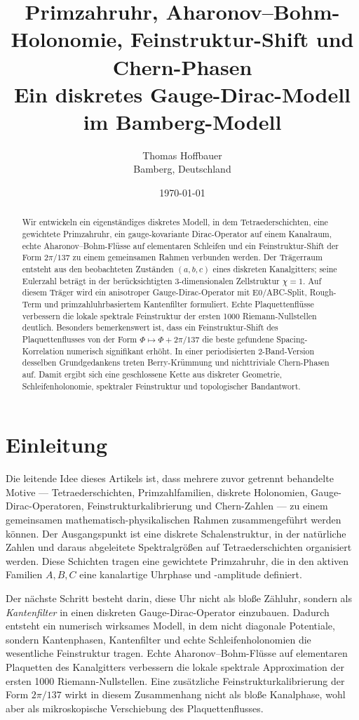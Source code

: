 \documentclass[11pt,a4paper]{article}
\title{Primzahruhr, Aharonov--Bohm-Holonomie, Feinstruktur-Shift und Chern-Phasen\\
	\large Ein diskretes Gauge-Dirac-Modell im Bamberg-Modell}
\author{Thomas Hoffbauer\\Bamberg, Deutschland}
\date{\today}
\theoremstyle{remark}
\begin{document}
	\maketitle
	
	\begin{abstract}
		Wir entwickeln ein eigenständiges diskretes Modell, in dem Tetraederschichten, eine gewichtete Primzahruhr, ein gauge-kovariante Dirac-Operator auf einem Kanalraum, echte Aharonov--Bohm-Flüsse auf elementaren Schleifen und ein Feinstruktur-Shift der Form $2\pi/137$ zu einem gemeinsamen Rahmen verbunden werden. Der Trägerraum entsteht aus den beobachteten Zuständen $(a,b,c)$ eines diskreten Kanalgitters; seine Eulerzahl beträgt in der berücksichtigten 3-dimensionalen Zellstruktur $\chi=1$. Auf diesem Träger wird ein anisotroper Gauge-Dirac-Operator mit E0/ABC-Split, Rough-Term und primzahluhrbasiertem Kantenfilter formuliert. Echte Plaquettenflüsse verbessern die lokale spektrale Feinstruktur der ersten 1000 Riemann-Nullstellen deutlich. Besonders bemerkenswert ist, dass ein Feinstruktur-Shift des Plaquettenflusses von der Form $\Phi\mapsto \Phi+2\pi/137$ die beste gefundene Spacing-Korrelation numerisch signifikant erhöht. In einer periodisierten 2-Band-Version desselben Grundgedankens treten Berry-Krümmung und nichttriviale Chern-Phasen auf. Damit ergibt sich eine geschlossene Kette aus diskreter Geometrie, Schleifenholonomie, spektraler Feinstruktur und topologischer Bandantwort.
	\end{abstract}
	
	\section{Einleitung}
	
	Die leitende Idee dieses Artikels ist, dass mehrere zuvor getrennt behandelte Motive --- Tetraederschichten, Primzahlfamilien, diskrete Holonomien, Gauge-Dirac-Operatoren, Feinstrukturkalibrierung und Chern-Zahlen --- zu einem gemeinsamen mathematisch-physikalischen Rahmen zusammengeführt werden können. Der Ausgangspunkt ist eine diskrete Schalenstruktur, in der natürliche Zahlen und daraus abgeleitete Spektralgrößen auf Tetraederschichten organisiert werden. Diese Schichten tragen eine gewichtete Primzahruhr, die in den aktiven Familien $A,B,C$ eine kanalartige Uhrphase und -amplitude definiert.
	
	Der nächste Schritt besteht darin, diese Uhr nicht als bloße Zähluhr, sondern als \emph{Kantenfilter} in einen diskreten Gauge-Dirac-Operator einzubauen. Dadurch entsteht ein numerisch wirksames Modell, in dem nicht diagonale Potentiale, sondern Kantenphasen, Kantenfilter und echte Schleifenholonomien die wesentliche Feinstruktur tragen. Echte Aharonov--Bohm-Flüsse auf elementaren Plaquetten des Kanalgitters verbessern die lokale spektrale Approximation der ersten 1000 Riemann-Nullstellen. Eine zusätzliche Feinstrukturkalibrierung der Form $2\pi/137$ wirkt in diesem Zusammenhang nicht als bloße Kanalphase, wohl aber als mikroskopische Verschiebung des Plaquettenflusses.
	
\end{document}

